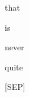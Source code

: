 \documentclass[varwidth=150mm]{standalone}
\begin{document}
\begin{CJK*}{UTF8}{gbsn}
{{{\colorbox{red!3.2427587509155273}{\strut that} \colorbox{red!6.9024529457092285}{\strut is} \colorbox{red!2.9271585941314697}{\strut never} \colorbox{red!4.022228240966797}{\strut quite} \colorbox{red!3.1974122524261475}{\strut [SEP]}
}}}
\end{CJK*}
\end{document}
